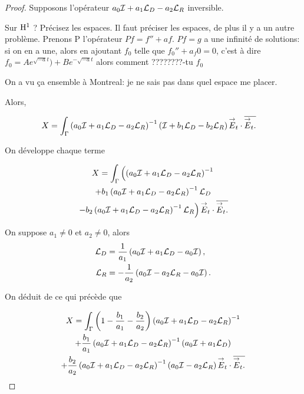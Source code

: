   \begin{proof}
    Supposons l'opérateur \(a_0\oI + a_1 \LD - a_2 \LR\) inversible.
    \begin{REM}
      Sur \(\Sobolev[1]\) ? Précisez les espaces. Il faut préciser les espaces, de plus il y a un autre problème. Prenons P l'opérateur
      \(Pf=f''+af\). \(Pf=g\) a une infinité de solutions: si on en a une, alors en ajoutant  \(f_0\) telle que \(f_0''+a_f0 =0\), c'est à dire \(f_0=Ae^{\sqrt{-a}t})+Be^{-\sqrt{-a}t}\) alors comment ????????-tu \(f_0\)
    \end{REM}
    \begin{REP}
      On a vu ça ensemble à Montreal: je ne sais pas dans quel espace me placer.
    \end{REP}
   Alors,

    \begin{align*}
      X &= \int_\Gamma \left(a_0\oI + a_1 \LD - a_2 \LR \right)^{-1}\left( \oI + b_1 \LD - b_2 \LR \right) \vE_t\cdot \conj{\vE_t.}
    \end{align*}

    On développe chaque terme

    \begin{multline*}
      X = \int_\Gamma \left(\left(a_0\oI + a_1 \LD - a_2 \LR \right)^{-1}
      \right.
      \\
      + b_1 \left(a_0\oI + a_1 \LD - a_2 \LR \right)^{-1}\LD
      \\
      \left.
      - b_2 \left(a_0\oI + a_1 \LD - a_2 \LR \right)^{-1}\LR \right) \vE_t\cdot \conj{\vE_t.}
    \end{multline*}

    On suppose \(a_1\not=0\) et \(a_2\not=0\), alors
    \begin{align*}
      \LD & = \frac{1}{a_1}\left(a_0\oI + a_1 \LD - a_0\oI\right),
      \\
      \LR & = -\frac{1}{a_2}\left(a_0\oI - a_2 \LR - a_0\oI\right).
    \end{align*}


    On déduit de ce qui précède que

    \begin{multline*}
      X = \int_\Gamma \left(1-\frac{b_1}{a_1} -\frac{b_2}{a_2}\right)\left(a_0\oI + a_1 \LD - a_2 \LR \right)^{-1}
      \\
      + \frac{b_1}{a_1} \left(a_0\oI + a_1 \LD - a_2 \LR \right)^{-1}\left(a_0\oI + a_1\LD\right)
      \\
      + \frac{b_2}{a_2} \left(a_0\oI + a_1 \LD - a_2 \LR \right)^{-1}\left(a_0\oI - a_2\LR\right) \vE_t\cdot \conj{\vE_t.}
    \end{multline*}


\end{proof}
